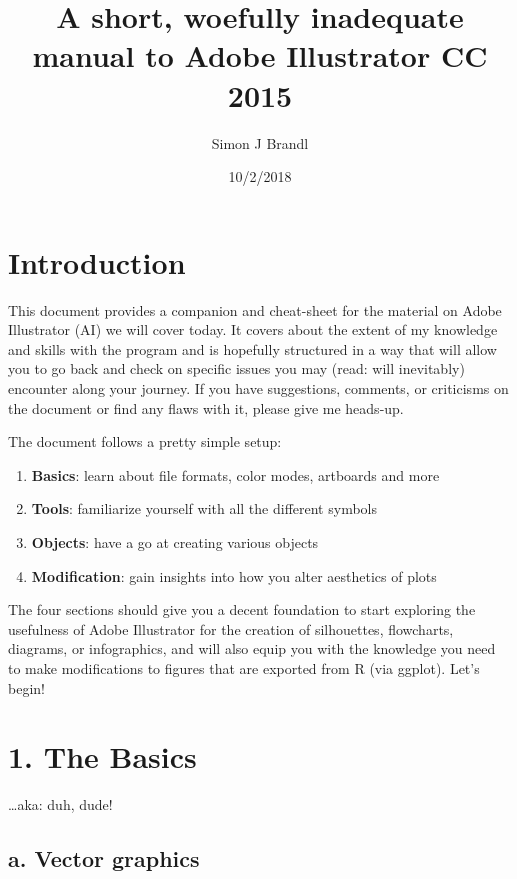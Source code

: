 \documentclass[]{article}
\title{\textbf{A short, woefully inadequate manual to Adobe Illustrator CC
2015}}
\author{Simon J Brandl}
\date{10/2/2018}
\providecommand{\tightlist}{%
  \setlength{\itemsep}{0pt}\setlength{\parskip}{0pt}}
\begin{document}
\maketitle

\section{Introduction}\label{introduction}

This document provides a companion and cheat-sheet for the material on
Adobe Illustrator (AI) we will cover today. It covers about the extent
of my knowledge and skills with the program and is hopefully structured
in a way that will allow you to go back and check on specific issues you
may (read: will inevitably) encounter along your journey. If you have
suggestions, comments, or criticisms on the document or find any flaws
with it, please give me heads-up.

The document follows a pretty simple setup:

\begin{enumerate}
\def\labelenumi{\arabic{enumi}.}
\tightlist
\item
  \textbf{Basics}: learn about file formats, color modes, artboards and
  more
\item
  \textbf{Tools}: familiarize yourself with all the different symbols
\item
  \textbf{Objects}: have a go at creating various objects
\item
  \textbf{Modification}: gain insights into how you alter aesthetics of
  plots
\end{enumerate}

The four sections should give you a decent foundation to start exploring
the usefulness of Adobe Illustrator for the creation of silhouettes,
flowcharts, diagrams, or infographics, and will also equip you with the
knowledge you need to make modifications to figures that are exported
from R (via ggplot). Let's begin!

\section{1. The Basics}\label{the-basics}

\ldots{}aka: duh, dude!

\subsection{a. Vector graphics}\label{a.-vector-graphics}
\end{document}
